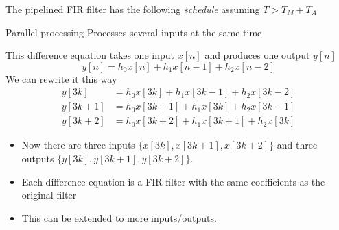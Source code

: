 \documentclass[10pt]{beamer}
\begin{document}
\begin{frame}
The pipelined FIR filter has the following \textit{schedule} assuming $T > T_M + T_A$ 

\begin{center}
	\def\PIPE{1}
	\resizebox{0.8\textwidth}{!}{}
\end{center}

\begin{center}
\end{center}

\end{frame}

\begin{frame}{Parallel processing}
Processes several inputs at the same time

This difference equation takes one input $x[n]$ and produces one output $y[n]$
\begin{equation*}
y[n] = h_0x[n] + h_1x[n-1] + h_2x[n-2]
\end{equation*}
\pause
We can rewrite it this way
\begin{align*}
y[3k] &= h_0x[3k] + h_1x[3k-1] + h_2x[3k-2] \\
y[3k+1] &= h_0x[3k+1] + h_1x[3k] + h_2x[3k-1] \\
y[3k+2] &= h_0x[3k+2] + h_1x[3k+1] + h_2x[3k]
\end{align*}

\begin{itemize}
	\item Now there are three inputs $\{x[3k], x[3k+1], x[3k+2]\}$ and three outputs $\{y[3k], y[3k+1], y[3k+2]\}$.
	\item Each difference equation is a FIR filter with the same coefficients as the original filter
	\item This can be extended to more inputs/outputs.
\end{itemize}
\end{frame}
\end{document}

